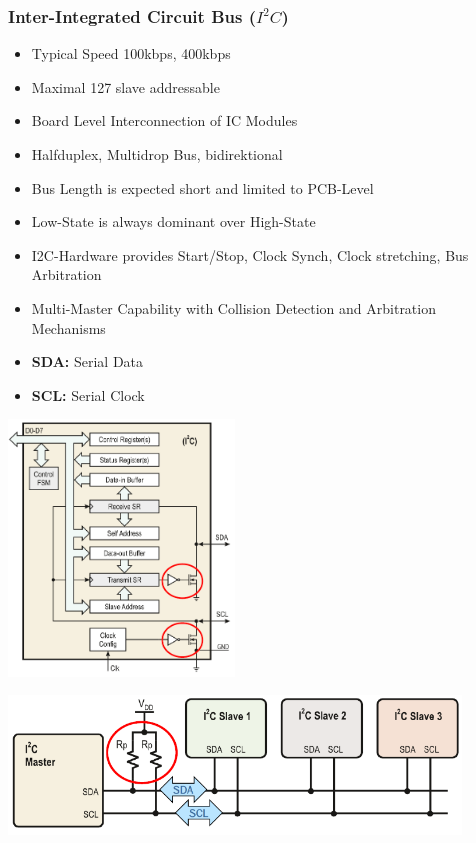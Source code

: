 \subsubsection{Inter-Integrated Circuit Bus ($I^2C$)}
\begin{minipage}{13cm}
	\begin{itemize}
		\item Typical Speed 100kbps, 400kbps
		\item Maximal 127 slave addressable
		\item Board Level Interconnection of IC Modules
		\item Halfduplex, Multidrop Bus, bidirektional
		\item Bus Length is expected short and limited to PCB-Level
		\item Low-State is always dominant over High-State
		\item \acs{I2C}-Hardware provides Start/Stop, Clock Synch, Clock stretching, Bus Arbitration
		\item Multi-Master Capability with Collision Detection and Arbitration Mechanisms
		\item \textbf{\acs{SDA}: }Serial Data
		\item \textbf{\acs{SCL}: }Serial Clock
	\end{itemize}
\end{minipage}
\begin{minipage}{6cm}
	\includegraphics[width=6cm]{images/i2c_internal.png}
\end{minipage}
\includegraphics[width=12cm]{images/i2c_1.png}
